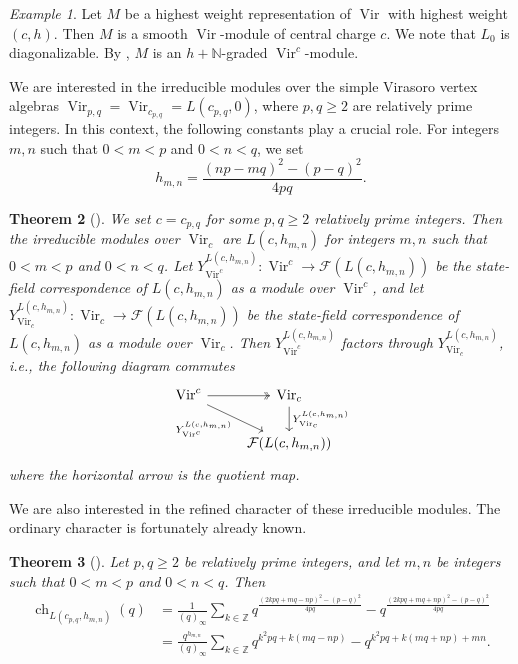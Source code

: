 \documentclass[a4paper, 12pt, reqno]{amsart}
\newtheorem{theorem}{Theorem}[section]
\theoremstyle{remark}
\newtheorem{example}[theorem]{Example}
\DeclareMathOperator{\Vir}{Vir}
\DeclareMathOperator{\ch}{ch}
\begin{document}
\begin{example}
  \label{exa:9}
  Let $M$ be a highest weight representation of $\Vir$ with highest weight $(c, h)$.
  Then $M$ is a smooth $\Vir$-module of central charge $c$.
  We note that $L_0$ is diagonalizable.
  By , $M$ is an $h + \mathbb{N}$-graded $\Vir^c$-module.
\end{example}

We are interested in the irreducible modules over the simple Virasoro vertex algebras $\Vir_{p, q} = \Vir_{c_{p, q}} = L(c_{p, q}, 0)$, where $p, q \ge 2$ are relatively prime integers.
In this context, the following constants play a crucial role.
For integers $m, n$ such that $0 < m < p$ and $0 < n < q$, we set
\begin{equation*}
  h_{m, n} = \frac{(np - mq)^2 - (p - q)^2}{4pq}.
\end{equation*}

\begin{theorem}[{\cite{wang_rationality_1993}}]
  \label{thr:9}
  We set $c = c_{p, q}$ for some $p, q \ge 2$ relatively prime integers.
  Then the irreducible modules over $\Vir_c$ are $L(c, h_{m, n})$ for integers $m, n$ such that $0 < m < p$ and $0 < n < q$.
  Let $Y^{L(c, h_{m, n})}_{\Vir^c}: \Vir^c \to \mathcal{F}(L(c, h_{m, n}))$ be the state-field correspondence of $L(c, h_{m, n})$ as a module over $\Vir^c$, and let $Y^{L(c, h_{m, n})}_{\Vir_c}: \Vir_c \to \mathcal{F}(L(c, h_{m, n}))$ be the state-field correspondence of $L(c, h_{m, n})$ as a module over $\Vir_c$.
  Then $Y^{L(c, h_{m, n})}_{\Vir^c}$ factors through $Y^{L(c, h_{m, n})}_{\Vir_c}$, i.e., the following diagram commutes
  \begin{equation*}
    \begin{tikzcd}
      \Vir^c \arrow[r, two heads] \arrow[rd, "{Y^{L(c, h_{m, n})}_{\Vir^c}}"'] & {\Vir_c} \arrow[d, "{Y^{L(c, h_{m, n})}_{\Vir_c}}"] \\
      & {\mathcal{F}(L(c, h_{m, n}))}
    \end{tikzcd}
  \end{equation*}
  where the horizontal arrow is the quotient map.
\end{theorem}

We are also interested in the refined character of these irreducible modules.
The ordinary character is fortunately already known.

\begin{theorem}[{\cite{feigin_verma_1984}}]
  \label{thr:10}
  Let $p, q \ge 2$ be relatively prime integers, and let $m, n$ be integers such that $0 < m < p$ and $0 < n < q$.
  Then
  \begin{align*}
    \ch_{L(c_{p, q}, h_{m, n})}(q) &= \frac{1}{(q)_{\infty}}\sum_{k \in \mathbb{Z}}q^{\frac{(2kpq + mq - np)^2 - (p - q)^2}{4pq}} - q^{\frac{(2kpq + mq + np)^2 - (p - q)^2}{4pq}} \\
                                   &= \frac{q^{h_{m, n}}}{(q)_{\infty}}\sum_{k \in \mathbb{Z}}q^{k^2pq + k(mq - np)} - q^{k^2pq + k(mq + np) + mn}.
  \end{align*}
\end{theorem}
\end{document}
